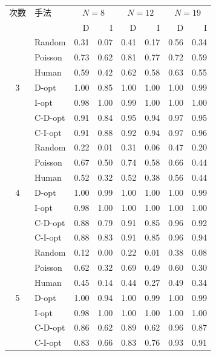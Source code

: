 \begin{tabular}{clrrrrrr}
\toprule
次数 & 手法 & \multicolumn{2}{c}{$N=8$} & \multicolumn{2}{c}{$N=12$} & \multicolumn{2}{c}{$N=19$} \\
 & & D & I & D & I & D & I \\
\midrule
\multirow{7}{*}{3} & Random & 0.31 & 0.07 & 0.41 & 0.17 & 0.56 & 0.34 \\
 & Poisson & 0.73 & 0.62 & 0.81 & 0.77 & 0.72 & 0.59 \\
 & Human & 0.59 & 0.42 & 0.62 & 0.58 & 0.63 & 0.55 \\
 & D-opt & 1.00 & 0.85 & 1.00 & 1.00 & 1.00 & 0.99 \\
 & I-opt & 0.98 & 1.00 & 0.99 & 1.00 & 1.00 & 1.00 \\
 & C-D-opt & 0.91 & 0.84 & 0.95 & 0.94 & 0.97 & 0.95 \\
 & C-I-opt & 0.91 & 0.88 & 0.92 & 0.94 & 0.97 & 0.96 \\
\midrule
\multirow{7}{*}{4} & Random & 0.22 & 0.01 & 0.31 & 0.06 & 0.47 & 0.20 \\
 & Poisson & 0.67 & 0.50 & 0.74 & 0.58 & 0.66 & 0.44 \\
 & Human & 0.52 & 0.32 & 0.52 & 0.38 & 0.56 & 0.44 \\
 & D-opt & 1.00 & 0.99 & 1.00 & 1.00 & 1.00 & 0.99 \\
 & I-opt & 0.98 & 1.00 & 1.00 & 1.00 & 1.00 & 1.00 \\
 & C-D-opt & 0.88 & 0.79 & 0.91 & 0.85 & 0.96 & 0.92 \\
 & C-I-opt & 0.88 & 0.83 & 0.91 & 0.85 & 0.96 & 0.94 \\
\midrule
\multirow{7}{*}{5} & Random & 0.12 & 0.00 & 0.22 & 0.01 & 0.38 & 0.08 \\
 & Poisson & 0.62 & 0.32 & 0.69 & 0.49 & 0.60 & 0.30 \\
 & Human & 0.45 & 0.14 & 0.44 & 0.27 & 0.49 & 0.34 \\
 & D-opt & 1.00 & 0.94 & 1.00 & 0.99 & 1.00 & 0.99 \\
 & I-opt & 0.98 & 1.00 & 1.00 & 1.00 & 1.00 & 1.00 \\
 & C-D-opt & 0.86 & 0.62 & 0.89 & 0.62 & 0.96 & 0.87 \\
 & C-I-opt & 0.83 & 0.66 & 0.83 & 0.76 & 0.93 & 0.91 \\
\bottomrule
\end{tabular}

